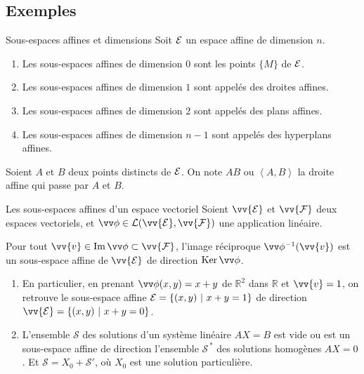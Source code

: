 \documentclass[
bigger]{m53beamer}
\begin{document}
\subsection{Exemples}
  \begin{frame}{Sous-espaces affines et dimensions}
    Soit $\mathcal{E}$ un espace affine de dimension $n$.
    \begin{enumerate}[<+(1)->]
      \item Les sous-espaces affines de dimension $0$ sont les points $\{M\}$ de $\mathcal{E}$.
      \item Les sous-espaces affines de dimension $1$ sont appelés \alert{des droites affines}.
      \item Les sous-espaces affines de dimension $2$ sont appelés \alert{des plans affines}.
      \item Les sous-espaces affines de dimension $n-1$ sont appelés \alert{des hyperplans affines}.
    \end{enumerate}\pause

    Soient $A$ et $B$ deux points distincts de $\mathcal{E}$. On note $AB$ ou $\left<A,B\right>$ la droite affine qui passe par $A$ et $B$.
  \end{frame}
  \begin{frame}{Les sous-espaces affines d'un espace vectoriel}
    Soient $\vv{\ens{E}}$ et $\vv{\ens{F}}$ deux espaces vectoriels, et $\vv\phi \in \mathcal{L}(\vv{\ens{E}},\vv{\ens{F}})$ une application linéaire.\pause\\
    \begin{proposition}
      Pour tout $\vv{v}\in\im\vv\phi\subset\vv{\ens{F}}$, l'image réciproque $\vv\phi^{-1}(\vv{v})$ est un sous-espace affine de $\vv{\ens{E}}$ de direction $\ker{\vv\phi}$.
    \end{proposition}
    \begin{enumerate}[<+(1)->]
      \item En particulier, en prenant $\vv\phi(x,y)=x+y$ de $\mathbb{R}^{2}$ dans $\mathbb{R}$ et $\vv{v}=1$, on retrouve le sous-espace affine $\mathcal{E}=\{(x,y)\ |\ x+y=1 \}$ de direction $\vv{\ens{E}}=\{(x,y)\ |\ x+y=0 \}$.
      \item L'ensemble $\mathcal{S}$ des solutions d'un système linéaire $AX=B$ est vide ou est un sous-espace affine de direction l'ensemble $\mathcal{S^{\,\ast}}$ des solutions homogènes $AX=0$. Et $\mathcal{S}=X_{0}+\mathcal{S}'$, où $X_{0}$ est une solution particulière.
    \end{enumerate}
  \end{frame}
\end{document}
